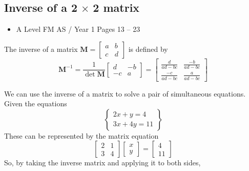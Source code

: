 \documentclass[11pt, a4paper]{article}
\begin{document}
\subsection{Inverse of a 2$\,\times\,$2 matrix}
\label{2x2inverse}
\begin{itemize}
\item A Level FM AS / Year 1 \hspace{1cm} Pages 13 -- 23
\end{itemize} \par
The inverse of a matrix $\boldsymbol{M}=\begin{bmatrix}a&b\\c&d\end{bmatrix}$ is defined by 
\begin{equation*}
\boldsymbol{M}^{-1}=\frac{1}{\det \boldsymbol{M}}\begin{bmatrix}d&-b\\-c&a\end{bmatrix}=\begin{bmatrix}\frac{d}{ad-bc}&\frac{-b}{ad-bc}\\\frac{-c}{ad-bc}&\frac{a}{ad-bc}\end{bmatrix}
\end{equation*} \newline \par
We can use the inverse of a matrix to solve a pair of simultaneous equations. Given the equations
\begin{equation*}
\begin{Bmatrix}2x+y=4 \\ 3x+4y=11 \end{Bmatrix}
\end{equation*}
These can be represented by the matrix equation
\begin{equation*}
\begin{bmatrix}2&1\\3&4\end{bmatrix}\begin{bmatrix}x\\y\end{bmatrix}=\begin{bmatrix}4\\11\end{bmatrix}
\end{equation*}
So, by taking the inverse matrix and applying it to both sides,
\end{document}
